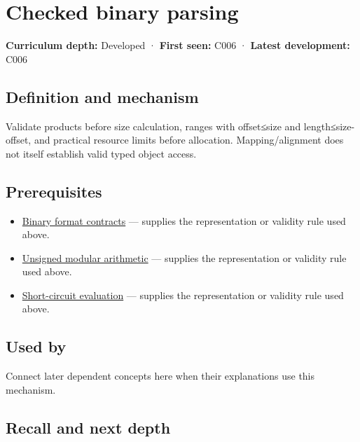 \hypertarget{appendix-652d81568de9}{}\label{referencestart:appendix-652d81568de9}
\section{Checked binary parsing}\label{appendix-652d81568de9-checked-binary-parsing}

\textbf{Curriculum depth:} Developed · \textbf{First seen:} C006 · \textbf{Latest development:} C006

\begin{allmightroledefinition}

\subsection{Definition and mechanism}\label{appendix-652d81568de9-definition-and-mechanism}

Validate products before size calculation, ranges with offset≤size and length≤size-offset, and practical resource limits before allocation. Mapping/alignment does not itself establish valid typed object access.

\end{allmightroledefinition}

\subsection{Prerequisites}\label{appendix-652d81568de9-prerequisites}

\begin{itemize}
\tightlist
\item
  \hyperref[appendix-590bbb2424c1]{Binary format contracts} --- supplies the representation or validity rule used above.
\item
  \hyperref[appendix-c99977d88b33]{Unsigned modular arithmetic} --- supplies the representation or validity rule used above.
\item
  \hyperref[appendix-2e245a6fa8d3]{Short-circuit evaluation} --- supplies the representation or validity rule used above.
\end{itemize}

\subsection{Used by}\label{appendix-652d81568de9-used-by}

Connect later dependent concepts here when their explanations use this mechanism.

\subsection{Recall and next depth}\label{appendix-652d81568de9-recall-and-next-depth}

